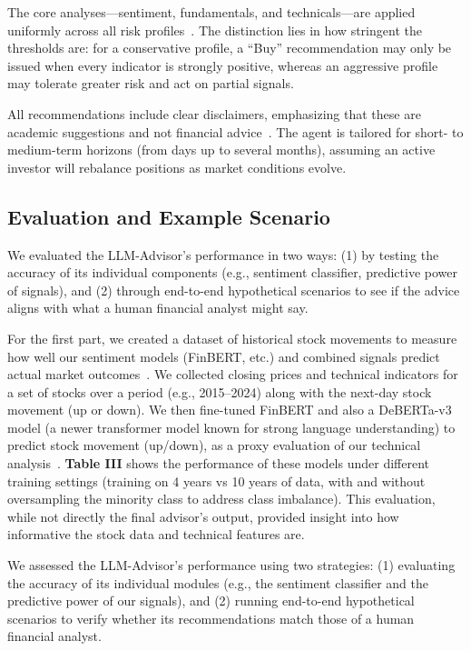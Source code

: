 \documentclass[conference]{IEEEtran}
\begin{document}
The core analyses—sentiment, fundamentals, and technicals—are applied uniformly across all risk profiles~\cite{hossain2019}. The distinction lies in how stringent the thresholds are: for a conservative profile, a ``Buy'' recommendation may only be issued when every indicator is strongly positive, whereas an aggressive profile may tolerate greater risk and act on partial signals.

\vspace{0.5em}

All recommendations include clear disclaimers, emphasizing that these are academic suggestions and not financial advice~\cite{fieberg2023}. The agent is tailored for short- to medium-term horizons (from days up to several months), assuming an active investor will rebalance positions as market conditions evolve.



\subsection{Evaluation and Example Scenario}

We evaluated the LLM-Advisor’s performance in two ways: (1) by testing the accuracy of its individual components (e.g., sentiment classifier, predictive power of signals), and (2) through end-to-end hypothetical scenarios to see if the advice aligns with what a human financial analyst might say.

For the first part, we created a dataset of historical stock movements to measure how well our sentiment models (FinBERT, etc.) and combined signals predict actual market outcomes~\cite{finbert2020, brown2020}. We collected closing prices and technical indicators for a set of stocks over a period (e.g., 2015--2024) along with the next-day stock movement (up or down). We then fine-tuned FinBERT and also a DeBERTa-v3 model (a newer transformer model known for strong language understanding) to predict stock movement (up/down), as a proxy evaluation of our technical analysis~\cite{deepfinance2021}. \textbf{Table III} shows the performance of these models under different training settings (training on 4 years vs 10 years of data, with and without oversampling the minority class to address class imbalance). This evaluation, while not directly the final advisor's output, provided insight into how informative the stock data and technical features are.

\vspace{0.5em}

We assessed the LLM-Advisor’s performance using two strategies: (1) evaluating the accuracy of its individual modules (e.g., the sentiment classifier and the predictive power of our signals), and (2) running end-to-end hypothetical scenarios to verify whether its recommendations match those of a human financial analyst.
\end{document}
